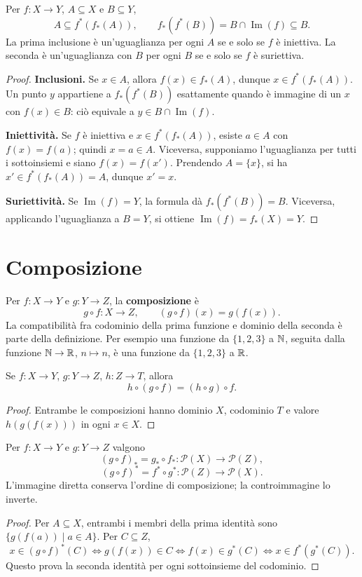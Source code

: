 \begin{proposizione}
Per $f:X\to Y$, $A\subseteq X$ e $B\subseteq Y$,
\[
A\subseteq f^*(f_*(A)),\qquad f_*(f^*(B))=B\cap\operatorname{Im}(f)\subseteq B.
\]
La prima inclusione è un'uguaglianza per ogni $A$ se e solo se $f$ è iniettiva. La seconda è un'uguaglianza con $B$ per ogni $B$ se e solo se $f$ è suriettiva.
\end{proposizione}
\begin{proof}
\textbf{Inclusioni.} Se $x\in A$, allora $f(x)\in f_*(A)$, dunque $x\in f^*(f_*(A))$. Un punto $y$ appartiene a $f_*(f^*(B))$ esattamente quando è immagine di un $x$ con $f(x)\in B$: ciò equivale a $y\in B\cap\operatorname{Im}(f)$.

\textbf{Iniettività.} Se $f$ è iniettiva e $x\in f^*(f_*(A))$, esiste $a\in A$ con $f(x)=f(a)$; quindi $x=a\in A$. Viceversa, supponiamo l'uguaglianza per tutti i sottoinsiemi e siano $f(x)=f(x')$. Prendendo $A=\{x\}$, si ha $x'\in f^*(f_*(A))=A$, dunque $x'=x$.

\textbf{Suriettività.} Se $\operatorname{Im}(f)=Y$, la formula dà $f_*(f^*(B))=B$. Viceversa, applicando l'uguaglianza a $B=Y$, si ottiene $\operatorname{Im}(f)=f_*(X)=Y$.
\end{proof}

\section{Composizione}
\begin{definizione}
Per $f:X\to Y$ e $g:Y\to Z$, la \textbf{composizione} è
\[
g\circ f:X\to Z,\qquad (g\circ f)(x)=g(f(x)).
\]
La compatibilità fra codominio della prima funzione e dominio della seconda è parte della definizione. Per esempio una funzione da $\{1,2,3\}$ a $\mathbb{N}$, seguita dalla funzione $\mathbb{N}\to\mathbb{R}$, $n\mapsto n$, è una funzione da $\{1,2,3\}$ a $\mathbb{R}$.
\end{definizione}

\begin{proposizione}[Associatività]
Se $f:X\to Y$, $g:Y\to Z$, $h:Z\to T$, allora
\[
h\circ(g\circ f)=(h\circ g)\circ f.
\]
\end{proposizione}
\begin{proof}
Entrambe le composizioni hanno dominio $X$, codominio $T$ e valore $h(g(f(x)))$ in ogni $x\in X$.
\end{proof}

\begin{proposizione}
Per $f:X\to Y$ e $g:Y\to Z$ valgono
\[
(g\circ f)_*=g_*\circ f_*:\mathcal P(X)\to\mathcal P(Z),
\]
\[
(g\circ f)^*=f^*\circ g^*:\mathcal P(Z)\to\mathcal P(X).
\]
L'immagine diretta conserva l'ordine di composizione; la controimmagine lo inverte.
\end{proposizione}
\begin{proof}
Per $A\subseteq X$, entrambi i membri della prima identità sono $\{g(f(a))\mid a\in A\}$. Per $C\subseteq Z$,
\[
x\in(g\circ f)^*(C)\iff g(f(x))\in C
\iff f(x)\in g^*(C)\iff x\in f^*(g^*(C)).
\]
Questo prova la seconda identità per ogni sottoinsieme del codominio.
\end{proof}

